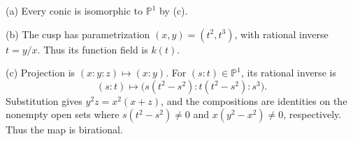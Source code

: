 (a) Every conic is isomorphic to $\mathbb P^1$ by (c).

(b) The cusp has parametrization $(x,y)=(t^2,t^3)$, with rational inverse $t=y/x$. Thus its function field is $k(t)$.

(c) Projection is $(x:y:z)\mapsto(x:y)$. For $(s:t)\in\mathbb P^1$, its rational inverse is
\[(s:t)\mapsto\bigl(s(t^2-s^2):t(t^2-s^2):s^3\bigr).\]
Substitution gives $y^2z=x^2(x+z)$, and the compositions are identities on the nonempty open sets where $s(t^2-s^2)\ne0$ and $x(y^2-x^2)\ne0$, respectively. Thus the map is birational.
